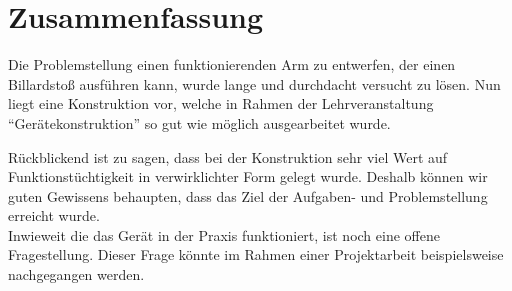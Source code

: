 \chapter{Zusammenfassung}
	Die Problemstellung einen funktionierenden Arm zu entwerfen, der einen Billardstoß ausführen kann, wurde lange und durchdacht versucht zu lösen.
	Nun liegt eine Konstruktion vor, welche in Rahmen der Lehrveranstaltung "`Gerätekonstruktion"' so gut wie möglich ausgearbeitet wurde.\par \medskip
	Rückblickend ist zu sagen, dass bei der Konstruktion sehr viel Wert auf Funktionstüchtigkeit in verwirklichter Form gelegt wurde.
	Deshalb können wir guten Gewissens behaupten, dass das Ziel der Aufgaben- und Problemstellung erreicht wurde.\\
	Inwieweit die das Gerät in der Praxis funktioniert, ist noch eine offene Fragestellung.
	Dieser Frage könnte im Rahmen einer Projektarbeit beispielsweise nachgegangen werden.